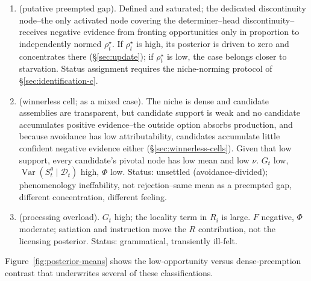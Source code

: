 \begin{enumerate}
\item {} (putative preempted gap). Defined and saturated; the dedicated discontinuity node--the only activated node covering the determiner--head discontinuity--receives negative evidence from fronting opportunities only in proportion to independently normed $\rho_t^\star$. If $\rho_t^\star$ is high, its posterior is driven to zero and concentrates there (\S\ref{sec:update}); if $\rho_t^\star$ is low, the case belongs closer to starvation. Status assignment requires the niche-norming protocol of \S\ref{sec:identification-c}.

\item {}  (winnerless cell;  as a mixed case). The niche is dense and candidate assemblies are transparent, but candidate support is weak and no candidate accumulates positive evidence--the outside option absorbs production, and because avoidance has low attributability, candidates accumulate little confident negative evidence either (\S\ref{sec:winnerless-cells}). Given that low support, every candidate's pivotal node has low mean and low $\nu$. $G_t$ low, $\operatorname{Var}(S_t^{\theta}\mid\mathcal{D}_t)$ high, $\Phi$ low. Status: unsettled (avoidance-divided); phenomenology ineffability, not rejection--same mean as a preempted gap, different concentration, different feeling.

\item {} (processing overload). $G_t$ high; the locality term in $R_i$ is large. $F$ negative, $\Phi$ moderate; satiation and instruction move the $R$ contribution, not the licensing posterior. Status: grammatical, transiently ill-felt.
\end{enumerate}

Figure~\ref{fig:posterior-means} shows the low-opportunity versus dense-preemption contrast that underwrites several of these classifications.

